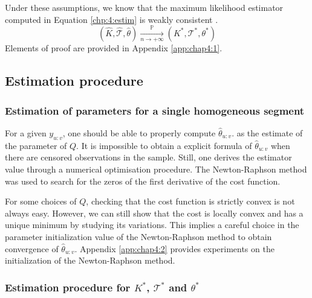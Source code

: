Under these assumptions, we know that the maximum likelihood estimator computed in Equation \ref{chp:4:estim} is weakly consistent \citep{Lavielle1997}. \begin{equation}
(\widehat{K},\widehat{\mathcal{T}},\widehat{\theta}) \xrightarrow[n\to+\infty]{\mathbb{P}} (K^*,\mathcal{T}^*,\theta^*)
\end{equation}
Elements of proof are provided in Appendix \ref{app:chap4:1}. 


\subsection{Estimation procedure}

\subsubsection{Estimation of parameters for a single homogeneous segment}

For a given $y_{u:v}$, one should be able to properly compute $\widehat{\theta}_{u:v}$. as the estimate of the parameter of $Q$. It is impossible to obtain a explicit formula of $\widehat{\theta}_{u:v}$ when there are censored observations in the sample. Still, one derives the estimator value through a numerical optimisation procedure. The Newton-Raphson method was used to search for the zeros of the first derivative of the cost function.  

For some choices of $Q$, checking that the cost function is strictly convex is not always easy. However, we can still show that the cost is locally convex and has a unique minimum by studying its variations. This implies a careful choice in the parameter initialization value of the Newton-Raphson method to obtain convergence of $\widehat{\theta}_{u:v}$. Appendix \ref{app:chap4:2} provides experiments on the initialization of the Newton-Raphson method. 

\subsubsection{Estimation procedure for $K^*$, $\mathcal{T}^*$ and $\theta^*$}

